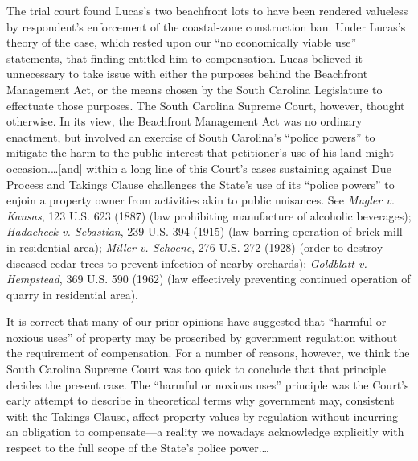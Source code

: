 The trial court found Lucas's two beachfront lots to have been rendered
valueless by respondent's enforcement of the coastal-zone construction
ban. Under Lucas's theory of the case, which rested upon our
``no economically viable use'' statements, that finding entitled him to
compensation. Lucas believed it unnecessary to take issue with either the
purposes behind the Beachfront Management Act, or the means chosen by the South
Carolina Legislature to effectuate those purposes. The South Carolina Supreme
Court, however, thought otherwise. In its view, the Beachfront Management Act
was no ordinary enactment, but involved an exercise of South Carolina's ``police
powers'' to mitigate the harm to the public interest that petitioner's use of
his land might occasion.\ldots [and] within a long line of this Court's cases
sustaining against Due Process and Takings Clause challenges the State's use of
its ``police powers'' to enjoin a property owner from activities akin to public
nuisances. See \textit{Mugler v. Kansas}, 123 U.S. 623 (1887) (law prohibiting
manufacture of alcoholic beverages); \textit{Hadacheck v. Sebastian}, 239 U.S.
394 (1915) (law barring operation of brick mill in residential area);
\textit{Miller v. Schoene}, 276 U.S. 272 (1928) (order to destroy diseased cedar
trees to prevent infection of nearby orchards); \textit{Goldblatt v. Hempstead},
369 U.S. 590 (1962) (law effectively preventing continued operation of quarry in
residential area).

It is correct that many of our prior opinions have suggested that ``harmful or
noxious uses'' of property may be proscribed by government regulation without
the requirement of compensation. For a number of reasons, however, we think the
South Carolina Supreme Court was too quick to conclude that that principle
decides the present case. The ``harmful or noxious uses'' principle was the
Court's early attempt to describe in theoretical terms why government may,
consistent with the Takings Clause, affect property values by regulation without
incurring an obligation to compensate---a reality we nowadays acknowledge
explicitly with respect to the full scope of the State's police power.\ldots

